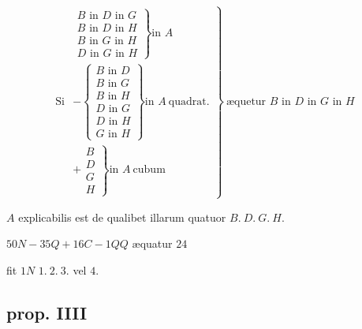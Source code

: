 \documentclass[11pt,a4paper]{article}
\begin{document}
\[ \text{Si } \left.\begin{array}{l} \left.\begin{array}{l} B \text{ in } D \text{ in } G \\ B \text{ in } D \text{ in } H \\ B \text{ in } G \text{ in } H \\ D \text{ in } G \text{ in } H \end{array}\right\} \text{in } A \\[1ex] -\left\{\begin{array}{l} B \text{ in } D \\ B \text{ in } G \\ B \text{ in } H \\ D \text{ in } G \\ D \text{ in } H \\ G \text{ in } H \end{array}\right\} \text{in } A\ \text{quadrat.} \\[1ex] +\left.\begin{array}{l} B \\ D \\ G \\ H \end{array}\right\} \text{in } A\ \text{cubum} \end{array}\right\}\ \text{æquetur } B \text{ in } D \text{ in } G \text{ in } H \]

$A$ explicabilis est de qualibet illarum quatuor $B.\ D.\ G.\ H.$

$50N - 35Q + 16C - 1QQ$ æquatur $24$

fit $1N$ \struck{\ill{}} $1.\ 2.\ 3.$ vel $4$.

\subsection*{prop. IIII}
\end{document}
